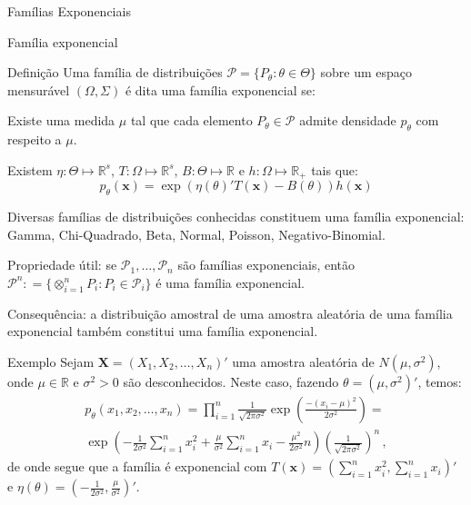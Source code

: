 \documentclass[11pt]{beamer}
\newenvironment{transitionframe}{
	\setbeamercolor{background canvas}{bg=yellow}
	\begin{frame}}{
	\end{frame}
}
\newenvironment{wideitemize}{\itemize\addtolength{\itemsep}{10pt}}{\enditemize}
\newenvironment{halfwideitemize}{\itemize\addtolength{\itemsep}{0.5em}}{\enditemize}
\newenvironment{halfwideenumerate}{\enumerate\addtolength{\itemsep}{0.5em}}{\endenumerate}
\begin{document}
	\begin{transitionframe}
		\centering 
		\Huge{Famílias Exponenciais}
	\end{transitionframe}
	\begin{frame}{Família exponencial}
		\begin{block}{Definição}
			Uma família de distribuições $\mathcal{P} = \{P_\theta : \theta \in \Theta\}$ sobre um espaço mensurável $(\Omega, \Sigma)$ é dita uma família exponencial se:
			\begin{halfwideenumerate}
				\item Existe uma medida $\mu$ tal que cada elemento $P_\theta \in \mathcal{P}$  admite densidade $p_\theta$ com respeito a $\mu$.
				\item Existem $\eta : {\Theta} \mapsto  \mathbb{R}^s$, $T: \Omega \mapsto \mathbb{R}^s$, $B: \Theta \mapsto \mathbb{R}$ e $h: \Omega \mapsto \mathbb{R}_+$ tais que:
				$$p_\theta(\boldsymbol{x}) = \exp(\eta(\theta)'T(\boldsymbol{x}) -B(\theta)) h(\boldsymbol{x})$$
			\end{halfwideenumerate}
		\end{block}
		\begin{halfwideitemize}
			\item Diversas famílias de distribuições conhecidas constituem uma família exponencial: Gamma, Chi-Quadrado, Beta, Normal, Poisson, Negativo-Binomial.
			\item Propriedade útil: se $\mathcal{P}_1,\ldots, \mathcal{P}_n$ são famílias exponenciais, então $\mathcal{P}^n : = \{\otimes_{i=1}^n P_i: P_i \in \mathcal{P}_i\}$ é uma família exponencial.
			\begin{wideitemize}
				\item Consequência: a distribuição amostral de uma amostra aleatória de uma família exponencial também constitui uma família exponencial.
			\end{wideitemize}
		\end{halfwideitemize}
	\end{frame}
	\begin{frame}{Exemplo}
		Sejam $\boldsymbol{X}= (X_1, X_2, \ldots, X_n)'$ uma amostra aleatória de $N(\mu, \sigma^2)$, onde $\mu \in \mathbb{R}$ e $\sigma^2 >0$ são desconhecidos. Neste caso, fazendo $\theta = (\mu, \sigma^2)'$, temos:
		\begin{equation}
			\begin{aligned}
				p_\theta(x_1,x_2,\ldots, x_n) = \prod_{i=1}^n \frac{1}{\sqrt{2\pi\sigma^2}}\exp\left(\frac{-(x_i-\mu)^2}{2\sigma^2}\right) =  \\ 
				\exp\left(-\frac{1}{2\sigma^2}\sum_{i=1}^n x_i^2 + \frac{\mu}{\sigma^2} \sum_{i=1}^n x_i - \frac{\mu^2}{2\sigma^2}n\right)\left(\frac{1}{\sqrt{2\pi\sigma^2}}\right)^n \, ,
			\end{aligned}
		\end{equation}
		de onde segue que a família é exponencial com $T(\boldsymbol{x}) = (\sum_{i=1}^n x_i^2, \sum_{i=1}^n x_i)'$ e ${\eta}(\theta) = \left(-\frac{1}{2\sigma^2}, \frac{\mu}{\sigma^2}\right)'$.
	\end{frame}
	
\end{document}

